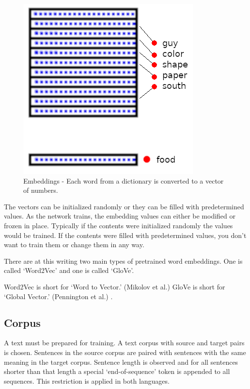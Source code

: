 \begin{figure}[H]
	\begin{center}
		\includegraphics[scale=0.5]{diagram-embedding}
		
		
	\end{center}
	\caption[Word Embeddings]{Embeddings - Each word from a dictionary is converted to a vector of numbers.}
	

\end{figure}

The vectors can be initialized randomly or they can be filled with predetermined values. As the network trains, the embedding values can either be modified or frozen in place. Typically if the contents were initialized randomly the values would be trained. If the contents were filled with predetermined values, you don\textquoteright t want to train them or change them in any way. 

There are at this writing two main types of pretrained word embeddings. One is called \textquoteleft Word2Vec\textquoteright{} and one is called \textquoteleft GloVe\textquoteright . 

Word2Vec is short for \textquoteleft Word to Vector.\textquoteright{} (Mikolov et al.) \cite{mikolov2013efficient} GloVe is short for \textquoteleft Global Vector.\textquoteright{} (Pennington et al.) \cite{pennington-etal-2014-glove} .


\subsection{Corpus}

A text must be prepared for training. A text corpus with source and target pairs is chosen. Sentences in the source corpus are paired with sentences with the same meaning in the target corpus. Sentence length is observed and for all sentences shorter than that length a special `end-of-sequence' token is appended to all sequences. This restriction is applied in both languages.

